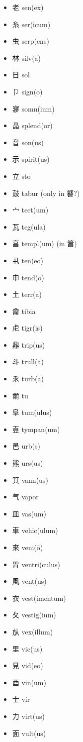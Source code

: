 \documentclass[xetex, svgnames, 12pt]{scrartcl}
\begin{document}
\begin{multicols}{3}
\begin{itemize}[noitemsep]
    \item 老 sen(ex)
    \item 糸 ser(icum)
    \item 虫 serp(ens)
    \item 林 %
    silv(a) %
    \item 日 sol 
    \item 卩 sign(o) 
    \item 㝱 
    somn(ium)
    \item 晶 splend(or)
    \item 音 son(us)
    \item 示 spirit(us) 
    \item 立 sto
    \item 鼓 tabur (only in 鼛?)
    \item 宀 tect(um) 
    \item 瓦 teg(ula) 
    \item 亯 templ(um) (in 䈞)
    \item 丮 ten(eo)
    \item 申 tend(o)
    \item 土 terr(a) 
    \item 龠 tibia 
    \item 虍 
    tigr(is) 
    \item 鼎 trip(us)
    \item 斗 
    trull(a) 
    \item 乑 turb(a)
    \item 爾 
    tu 
    \item 阜 tum(ulus) 
    \item 壴 
    tympan(um) 
    \item 邑 urb(s) 
    \item 熊 urs(us)
    \item 箕 vann(us)
    \item 气 vapor
    \item 皿 vas(um) 
    \item 車 vehic(ulum) 
    \item 來 veni(ō)
    \item 胃 ventri(culus)
    \item 風 vent(us)
    \item 衣 vest(imentum) 
    \item 夂 vestig(ium)
    \item 㫃 vex(illum) 
    \item 里 vic(us) 
    \item 見 vid(eo) 
    \item 酉 vin(um)
    \item 士 vir
    \item 力 virt(us)
    \item 面 vult(us)
\end{itemize}
\end{multicols}
\end{document}

